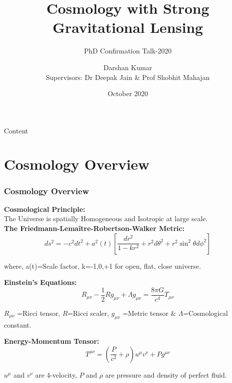 \documentclass[xcolor=table,bigger]{beamer}
\title{Cosmology with Strong Gravitational Lensing}
\author{Darshan Kumar\\Supervisors: Dr Deepak Jain \& Prof Shobhit Mahajan}
\date{October 2020}
\institute{\vskip1ex Department of Physics \& Astrophysics\\ \vskip-1ex University of Delhi}
\subtitle{PhD Confirmation Talk-2020}
\begin{document}
\maketitle
{}
\begin{frame}{Content}{}
\tableofcontents
\end{frame}

\section{ Cosmology Overview}
\begin{frame}
 \frametitle{Cosmology Overview}
 \vspace{3mm}
 \textbf{Cosmological Principle:} \\
The Universe is spatially Homogeneous and Isotropic at large scale.
\vspace{2mm}\\
  \textbf{The Friedmann-Lema\^{i}tre-Robertson-Walker Metric:}
$$d s^{2}=-c^{2} d t^{2}+a^{2}(t)\left[\dfrac{d r^{2}}{1-k r^{2}}+r^{2} d \theta^{2}+r^{2} \sin ^{2} \theta d \phi^{2}\right]$$
\begin{flushright}
{\scriptsize where, a(t)=Scale factor, k=-1,0,+1 for open, flat, close universe.}
\end{flushright}
\vspace{2mm}
  \textbf{Einstein’s Equations:}
 $$
 R_{\mu \nu}-\dfrac{1}{2} R g_{\mu \nu}+\Lambda g_{\mu \nu}=\dfrac{8 \pi G}{c^{4}} T_{\mu \nu}
 $$
 \begin{flushright}
 {\scriptsize $R_{\mu\nu}$ =Ricci tensor, $R$=Ricci scaler, $g_{\mu\nu}$ =Metric tensor \& $\Lambda$=Cosmological constant.}
 \end{flushright}
 \vspace{2mm}
   \textbf{ Energy-Momentum Tensor:}
$$
T^{\mu \nu}=(\dfrac{P}{c^2}+\rho) u^{\mu} v^{\nu}+Pg^{\mu \nu}
$$
\begin{flushright}
\begin{scriptsize}
$u^\mu$ and $v^\nu$ are 4-velocity, $P$ and $\rho$ are pressure and density of perfect fluid.
\end{scriptsize}
\end{flushright}
\end{frame}
\newpage
\end{document}
